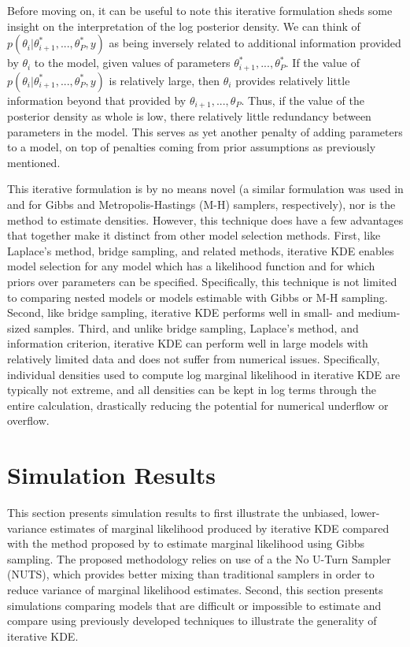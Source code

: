 \documentclass[twocolumn]{article}
\begin{document}
Before moving on, it can be useful to note this iterative formulation sheds some insight on the interpretation of the log posterior density. We can think of $p(\theta_i|\theta_{i+1}^*, ..., \theta_P^*, y)$ as being inversely related to additional information provided by $\theta_i$ to the model, given values of parameters $\theta_{i+1}^*, ..., \theta_P^*$. If the value of $p(\theta_i|\theta_{i+1}^*, ..., \theta_P^*, y)$ is relatively large, then $\theta_i$ provides relatively little information beyond that provided by $\theta_{i+1}, ..., \theta_P$. Thus, if the value of the posterior density as whole is low, there relatively little redundancy between parameters in the model. This serves as yet another penalty of adding parameters to a model, on top of penalties coming from prior assumptions as previously mentioned.

This iterative formulation is by no means novel (a similar formulation was used in \cite{Chib} and \cite{ChibJeliazkov} for Gibbs and Metropolis-Hastings (M-H) samplers, respectively), nor is the method to estimate densities. However, this technique does have a few advantages that together make it distinct from other model selection methods. First, like Laplace's method, bridge sampling, and related methods, iterative KDE enables model selection for any model which has a likelihood function and for which priors over parameters can be specified. Specifically, this technique is not limited to comparing nested models or models estimable with Gibbs or M-H sampling. Second, like bridge sampling, iterative KDE performs well in small- and medium-sized samples. Third, and unlike bridge sampling, Laplace's method, and information criterion, iterative KDE can perform well in large models with relatively limited data and does not suffer from numerical issues. Specifically, individual densities used to compute log marginal likelihood in iterative KDE are typically not extreme, and all densities can be kept in log terms through the entire calculation, drastically reducing the potential for numerical underflow or overflow.

\section{Simulation Results}

This section presents simulation results to first illustrate the unbiased, lower-variance estimates of marginal likelihood produced by iterative KDE compared with the method proposed by \cite{Chib} to estimate marginal likelihood using Gibbs sampling. The proposed methodology relies on use of a the No U-Turn Sampler (NUTS), which provides better mixing than traditional samplers in order to reduce variance of marginal likelihood estimates. Second, this section presents simulations comparing models that are difficult or impossible to estimate and compare using previously developed techniques to illustrate the generality of iterative KDE.
\end{document}
